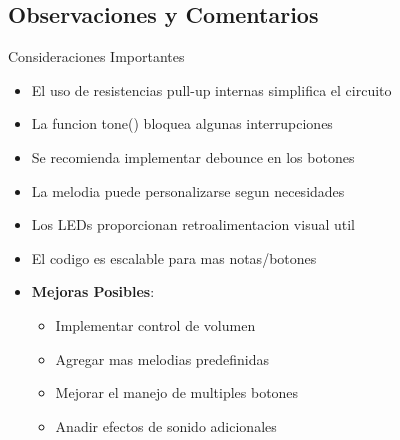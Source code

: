 \subsection{Observaciones y Comentarios}
\begin{componentBox}{Consideraciones Importantes}
	\begin{itemize}[leftmargin=*,itemsep=1pt,parsep=1pt]
		\item El uso de resistencias pull-up internas simplifica el circuito
		\item La funcion tone() bloquea algunas interrupciones
		\item Se recomienda implementar debounce en los botones
		\item La melodia puede personalizarse segun necesidades
		\item Los LEDs proporcionan retroalimentacion visual util
		\item El codigo es escalable para mas notas/botones
	\end{itemize}
	
	\begin{itemize}[leftmargin=*,itemsep=1pt,parsep=1pt]
		\item \textbf{Mejoras Posibles}:
		\begin{itemize}[itemsep=0pt,parsep=0pt]
			\item Implementar control de volumen
			\item Agregar mas melodias predefinidas
			\item Mejorar el manejo de multiples botones
			\item Anadir efectos de sonido adicionales
		\end{itemize}
	\end{itemize}
\end{componentBox}